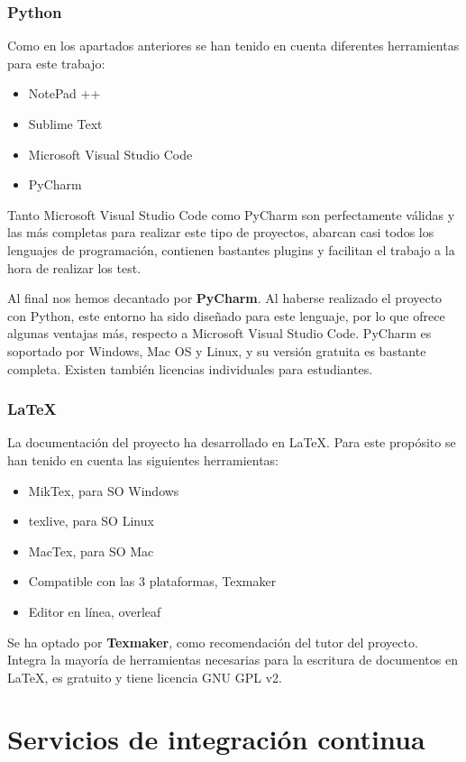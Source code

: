 \subsubsection{Python}

Como en los apartados anteriores se han tenido en cuenta diferentes herramientas para este trabajo:
\begin{itemize}
\item NotePad ++
\item Sublime Text
\item Microsoft Visual Studio Code
\item PyCharm
\end{itemize}

Tanto Microsoft Visual Studio Code como PyCharm son perfectamente válidas y las más completas para realizar este tipo de proyectos, abarcan casi todos los lenguajes de programación, contienen bastantes plugins y facilitan el trabajo a la hora de realizar los test.

Al final nos hemos decantado por \textbf{PyCharm}. Al haberse realizado el proyecto con Python, este entorno ha sido diseñado para este lenguaje, por lo que ofrece algunas ventajas más, respecto a Microsoft Visual Studio Code. PyCharm es soportado por Windows, Mac OS y Linux, y su versión gratuita es bastante completa. Existen también licencias individuales para estudiantes.



\subsubsection{\LaTeX}
La documentación del proyecto ha desarrollado en \LaTeX. Para este propósito se han tenido en cuenta las siguientes herramientas:
\begin{itemize}
\item MikTex, para SO Windows
\item texlive, para SO Linux
\item MacTex, para SO Mac
\item Compatible con las 3 plataformas, Texmaker
\item Editor en línea, overleaf
\end{itemize}

Se ha optado por \textbf{Texmaker}, como recomendación del tutor del proyecto.
Integra la mayoría de herramientas necesarias para la escritura de documentos en \LaTeX, es gratuito y tiene licencia GNU GPL v2.

\section{Servicios de integración continua}


